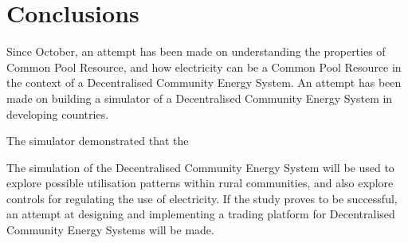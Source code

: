 \chapter{Conclusions}
\label{Conclusions}

Since October, an attempt has been made on understanding the properties of Common Pool Resource, and how electricity can be a Common Pool Resource in the context of a Decentralised Community Energy System. An attempt has been made on building a simulator of a Decentralised Community Energy System in developing countries. 

The simulator demonstrated that the 

The simulation of the Decentralised Community Energy System will be used to explore possible utilisation patterns within rural communities, and also explore controls for regulating the use of electricity. If the study proves to be successful, an attempt at designing and implementing a trading platform for Decentralised Community Energy Systems will be made. 